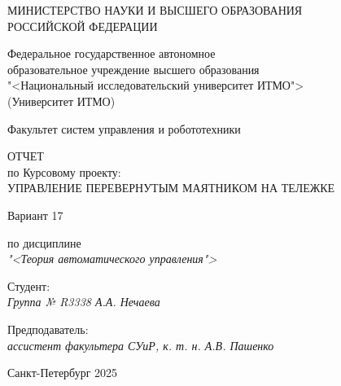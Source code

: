 \thispagestyle{empty}

\begin{center}
    МИНИСТЕРСТВО НАУКИ И ВЫСШЕГО ОБРАЗОВАНИЯ \\ РОССИЙСКОЙ ФЕДЕРАЦИИ

    \vspace{20pt}

    Федеральное государственное автономное \\ образовательное учреждение высшего образования \\
    "<Национальный исследовательский университет ИТМО"> \\
    (Университет ИТМО)

    \vspace{20pt}

    Факультет систем управления и робототехники 
\end{center}

\vfill

\begin{center}
    ОТЧЕТ \\  
    по Курсовому проекту: \\
    \uppercase{Управление перевернутым маятником на тележке}
    \vspace{20pt}
    
    Вариант 17 \\

    \vspace{20pt}
    
    по дисциплине \\
    \textit{"<Теория автоматического управления">}

\end{center}

\vfill

    \noindent Студент: \\
    \textit{Группа № R3338 \hfill А.А. Нечаева}

    \vspace{20pt}

    \noindent Предподаватель: \\
    \textit{ассистент факультера СУиР, к. т. н. \hfill А.В. Пашенко}

\vfill

\begin{center}
    Санкт-Петербург 2025
\end{center}